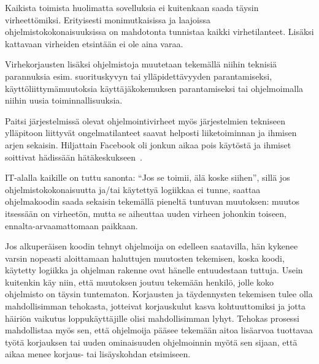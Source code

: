 \documentclass[finnish]{tktltiki2}
\theoremstyle{definition}
\theoremstyle{remark}
\begin{document}
Kaikista toimista huolimatta sovelluksia ei kuitenkaan saada täysin virheettömiksi. Erityisesti monimutkaisissa ja laajoissa ohjelmistokokonaisuuksissa on mahdotonta tunnistaa kaikki virhetilanteet. Lisäksi kattavaan virheiden etsintään ei ole aina varaa.

Virhekorjausten lisäksi ohjelmistoja muutetaan tekemällä niihin teknisiä parannuksia esim. suorituskyvyn tai ylläpidettävyyden parantamiseksi, käyttöliittymämuutoksia käyttäjäkokemuksen parantamiseksi tai ohjelmoimalla niihin uusia toiminnallisuuksia.

Paitsi järjestelmissä olevat ohjelmointivirheet myös järjestelmien tekniseen ylläpitoon liittyvät ongelmatilanteet saavat helposti liiketoiminnan ja ihmisen arjen sekaisin. Hiljattain Facebook oli jonkun aikaa pois käytöstä ja ihmiset soittivat hädissään hätäkeskukseen~\cite{facebook-down}.

IT-alalla kaikille on tuttu sanonta: ``Jos se toimii, älä koske siihen'', sillä jos ohjelmistokokonaisuutta ja/tai käytettyä logiikkaa ei tunne, saattaa ohjelmakoodin saada sekaisin tekemällä pieneltä tuntuvan muutoksen: muutos itsessään on virheetön, mutta se aiheuttaa uuden virheen johonkin toiseen, ennalta-arvaamattomaan paikkaan.


Jos alkuperäisen koodin tehnyt ohjelmoija on edelleen saatavilla, hän kykenee varsin nopeasti aloittamaan haluttujen muutosten tekemisen, koska koodi, käytetty logiikka ja ohjelman rakenne ovat hänelle entuudestaan tuttuja. Usein kuitenkin käy niin, että muutoksen joutuu tekemään henkilö, jolle koko ohjelmisto on täysin tuntematon.
Korjausten ja täydennysten tekemisen tulee olla mahdollisimman tehokasta, jotteivat korjauskulut kasva kohtuuttomiksi ja jotta häiriön vaikutus loppukäyttäjille olisi mahdollisimman lyhyt. Tehokas prosessi mahdollistaa myös sen, että ohjelmoija pääsee tekemään aitoa lisäarvoa tuottavaa työtä korjauksen tai uuden ominaisuuden ohjelmoinnin myötä sen sijaan, että aikaa menee korjaus- tai lisäyskohdan etsimiseen.

\end{document}

